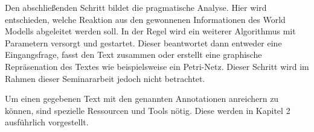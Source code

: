 Den abschließenden Schritt bildet die pragmatische Analyse. Hier wird entschieden, welche Reaktion aus den gewonnenen Informationen des World Modells abgeleitet werden soll. In der Regel wird ein weiterer Algorithmus mit Parametern versorgt und gestartet. Dieser beantwortet dann entweder eine Eingangsfrage, fasst den Text zusammen oder erstellt eine graphische Repräsenation des Textes wie beispielsweise ein Petri-Netz. Dieser Schritt wird im Rahmen dieser Seminararbeit jedoch nicht betrachtet.

Um einen gegebenen Text mit den genannten Annotationen anreichern zu können, sind spezielle Ressourcen und Tools nötig. Diese werden in Kapitel 2 ausführlich vorgestellt.






